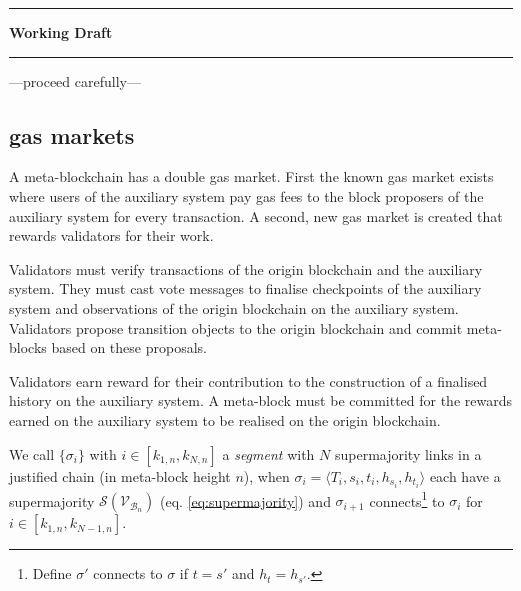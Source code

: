 \documentclass[12pt,a4paper]{article}
\begin{document}



\newpage

\begin{versionhistory}
\end{versionhistory}

\newpage
\begin{center}
\rule{\textwidth}{.4pt}\par
{\huge\bfseries Working Draft \par}
\rule{\textwidth}{.4pt}\par
\bigbreak
{\Large ---proceed carefully---\par}
\end{center}


\subsection{gas markets}

A meta-blockchain has a double gas market.
First the known gas market exists where users of the auxiliary system pay gas fees to the block proposers of the auxiliary system for every transaction.
A second, new gas market is created that rewards validators for their work.

Validators must verify transactions of the origin blockchain and the auxiliary system.  They must cast vote messages to finalise checkpoints of the auxiliary system and observations of the origin blockchain on the auxiliary system.
Validators propose transition objects to the origin blockchain and commit meta-blocks based on these proposals.

Validators earn reward for their contribution to the construction of a finalised history on the auxiliary system.  A meta-block must be committed for the rewards earned on the auxiliary system to be realised on the origin blockchain.

We call $\{\sigma_i\}$ with $i \in [k_{1,n}, k_{N,n}]$ a \emph{segment} with $N$ supermajority links in a justified chain (in meta-block height $n$), when $\sigma_i = \langle T_i, s_i, t_i, h_{s_i}, h_{t_i} \rangle$ each have a supermajority $\mathcal{S}(\mathcal{V}_{\mathcal{B}_n})$ (eq. \ref{eq:supermajority}) and $\sigma_{i+1}$ connects\footnote{
  Define $\sigma'$ connects to $\sigma$ if $t = s'$ and $h_{t} = h_{s'}$.}
to $\sigma_i$ for $i \in [k_{1,n}, k_{N-1,n}]$.
\end{document}
